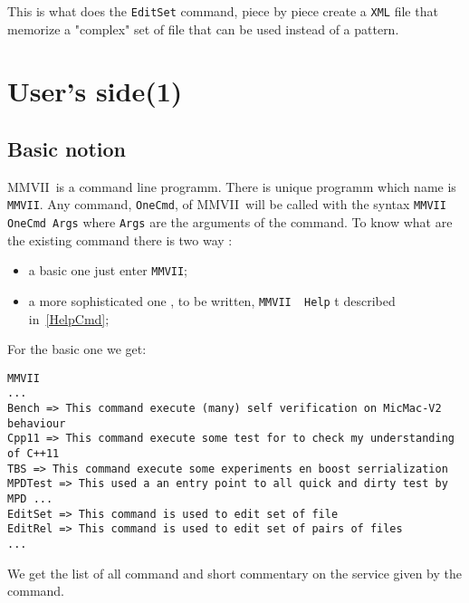\documentclass[a4paper]{book}
\newcommand{\PPP}{MMVII}
\newcommand{\CdPPP}{{\tt MMVII}}
\begin{document}
This is what does the  {\tt EditSet} command, piece by piece create a
{\tt XML} file that memorize a "complex" set of file that can be used
instead of a pattern.


\section{User's side(1)}


\subsection{Basic notion }

\PPP\, is a command line programm. There is unique programm which
name is \CdPPP. Any command, {\tt OneCmd}, of \PPP\, will be called with the 
syntax {\tt  \CdPPP\,  OneCmd Args} where {\tt Args} are the arguments
of the command. To know what are the existing command there is two way :

\begin{itemize}
   \item  a basic one just enter  {\tt  \CdPPP};
   \item  a more sophisticated one , to be written,  {\tt  \CdPPP\, Help} t
          described in~\ref{HelpCmd};
\end{itemize}

For the basic one we get:

\begin{verbatim}
MMVII
... 
Bench => This command execute (many) self verification on MicMac-V2 behaviour
Cpp11 => This command execute some test for to check my understanding of C++11
TBS => This command execute some experiments en boost serrialization
MPDTest => This used a an entry point to all quick and dirty test by MPD ...
EditSet => This command is used to edit set of file
EditRel => This command is used to edit set of pairs of files
...
\end{verbatim}

We get the list of all command and short commentary on the service given by
the command.

\end{document}
